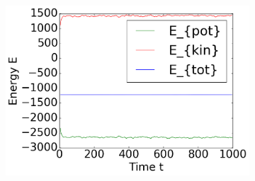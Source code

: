 \begin{figure}[ht]
\begin{subfigure}{0.28\textwidth}
\end{subfigure}
\hfill
\begin{subfigure}{0.28\textwidth}
\includegraphics[width=\textwidth]{../dat/avEnergies_M10.png}
\end{subfigure}


\end{figure}
